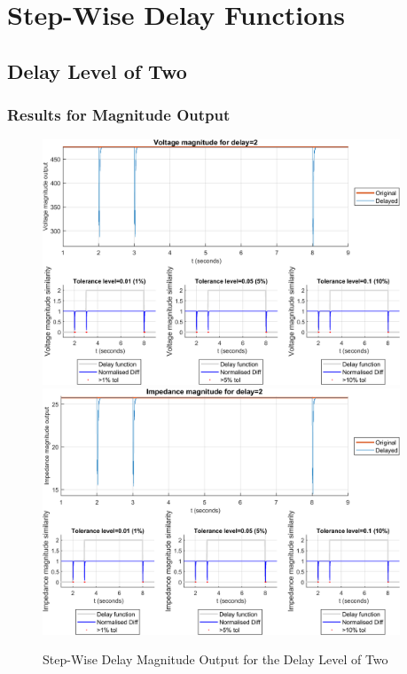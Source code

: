 \section{Step-Wise Delay Functions}
\subsection{Delay Level of Two}
\subsubsection{Results for Magnitude Output}

\begin{figure}
    \caption{Step-Wise Delay Magnitude Output for the Delay Level of Two}
    \includegraphics[width=0.95\textwidth]{PMUsim-figures/DelayOf_2/Step_vMagnitude.png}    
      \includegraphics[width=0.95\textwidth]{PMUsim-figures/DelayOf_2/Step_iMagnitude.png}    
    \label{fig:PMUsimStep_Two_Magnitude}
    \begin{small}
     \end{small}
\end{figure}

